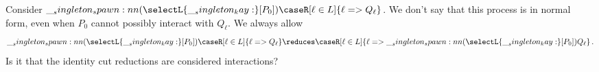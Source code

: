 Consider $\spawn{(\selectL{\kay}[P_0])}{\caseR[\ell \in L]{\ell => Q_{\ell}}}$.
We don't say that this process is in normal form, even when $P_0$ cannot possibly interact with $Q_{\ell}$.
We always allow
\begin{equation*}
  \spawn{(\selectL{\kay}[P_0])}{\caseR[\ell \in L]{\ell => Q_{\ell}}} \reduces \caseR[\ell \in L]{\ell => \spawn{(\selectL{\kay}[P_0])}{Q_{\ell}}}
  \,.
\end{equation*}
Is it that the identity cut reductions are considered interactions?







